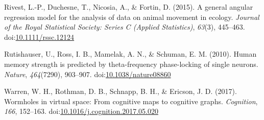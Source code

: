 \documentclass[11pt,]{article}
\begin{document}
\leavevmode\hypertarget{ref-rivest2015general}{}%
Rivest, L.-P., Duchesne, T., Nicosia, A., \& Fortin, D. (2015). A
general angular regression model for the analysis of data on animal
movement in ecology. \emph{Journal of the Royal Statistical Society:
Series C (Applied Statistics)}, \emph{63}(3), 445--463.
doi:\href{https://doi.org/10.1111/rssc.12124}{10.1111/rssc.12124}

\leavevmode\hypertarget{ref-rutishauser2010human}{}%
Rutishauser, U., Ross, I. B., Mamelak, A. N., \& Schuman, E. M. (2010).
Human memory strength is predicted by theta-frequency phase-locking of
single neurons. \emph{Nature}, \emph{464}(7290), 903--907.
doi:\href{https://doi.org/10.1038/nature08860}{10.1038/nature08860}

\leavevmode\hypertarget{ref-warren2017wormholes}{}%
Warren, W. H., Rothman, D. B., Schnapp, B. H., \& Ericson, J. D. (2017).
Wormholes in virtual space: From cognitive maps to cognitive graphs.
\emph{Cognition}, \emph{166}, 152--163.
doi:\href{https://doi.org/10.1016/j.cognition.2017.05.020}{10.1016/j.cognition.2017.05.020}
\end{document}

